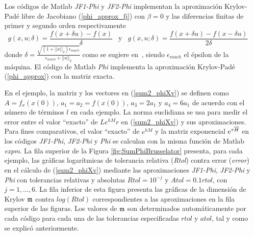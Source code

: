 Los códigos de Matlab \textit{JF1-Phi} y \textit{JF2-Phi} implementan la aproximación Krylov-Padé libre de Jacobiano (\ref{phi_approx_fj}) con $\beta=0$ y las diferencias finitas de primer y segundo orden respectivamente
\begin{equation}\label{finite-differences}
	g(x,u;\delta)=\frac{f(x+\delta u)-f(x)}{\delta}  \;\;\; \text{y} \;\;\; g(x,u;\delta)=\frac{f(x+\delta u)-f(x-\delta u)}{2\delta}
\end{equation}
donde $\delta= \frac{\sqrt{(1+||x||_2)\epsilon_{mach}}}{\epsilon_{mach}+||u||_2}$ como se sugiere en~\cite{knoll2004jacobian}, siendo $\epsilon_{mach}$ el épsilon de la máquina. El código de Matlab \textit{Phi} implementa la aproximación Krylov-Padé (\ref{phi_approx}) con la matriz exacta.

En el ejemplo, la matriz y los vectores en (\ref{sum2_phiXv}) se definen como $A=f_x(x(0))$, $a_1=a_2=f(x(0))$, $a_3=2a_1 $ y $a_4=6a_1$ de acuerdo con el número de términos $l$ en cada ejemplo. La norma euclidiana se usa para medir el error entre el valor ``exacto'' de $L e^{h M}r$ en (\ref{sum2_phiXv}) y sus aproximaciones. Para fines comparativos, el valor ``exacto'' de $e^{h M}$ y la matriz exponencial $\mathrm{e}^{\tau\overline{H}}$ en los códigos \textit{JF1-Phi}, \textit{JF2-Phi} y \textit{Phi} se calculan con la misma función de Matlab \textit{expm}. La fila superior de la Figura \ref{fig:SumPhiBrusselator} presenta, para cada ejemplo, las gráficas logarítmicas de tolerancia relativa (\textit{Rtol}) contra error (\textit{error}) en el cálculo de (\ref{sum2_phiXv}) mediante las aproximaciones \textit{JF1-Phi}, \textit{JF2-Phi} y \textit{Phi} con tolerancias relativas y absolutas $Rtol=10^{-j}$ y $Atol=0.1 rtol$, con $j=1,\ldots,6$. La fila inferior de esta figura presenta las gráficas de la dimensión de Krylov $\mathfrak{m}$ contra $log(Rtol)$ correspondientes a las aproximaciones en la fila superior de las figuras. Los valores de $\mathfrak{m}$ son determinados automáticamente por cada código para cada una de las tolerancias especificadas $rtol$ y $atol$, tal y como se explicó anteriormente.

